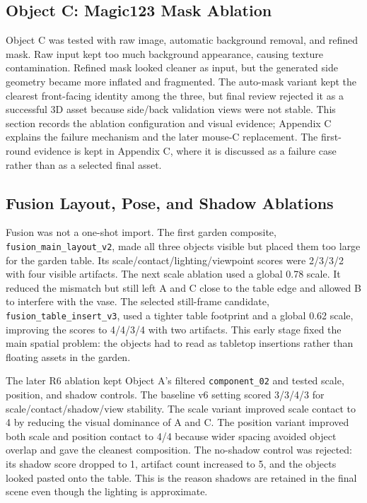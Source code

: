 \documentclass[10pt,twocolumn,letterpaper]{article}
\begin{document}
\subsection{Object C: Magic123 Mask Ablation}
Object C was tested with raw image, automatic background removal, and refined mask.
Raw input kept too much background appearance, causing texture contamination.
Refined mask looked cleaner as input, but the generated side geometry became more inflated and fragmented.
The auto-mask variant kept the clearest front-facing identity among the three, but final review rejected it as a successful 3D asset because side/back validation views were not stable.
This section records the ablation configuration and visual evidence; Appendix C explains the failure mechanism and the later mouse-C replacement.
The first-round evidence is kept in Appendix C, where it is discussed as a failure case rather than as a selected final asset.

\subsection{Fusion Layout, Pose, and Shadow Ablations}
Fusion was not a one-shot import.
The first garden composite, \texttt{fusion\_main\_layout\_v2}, made all three objects visible but placed them too large for the garden table.
Its scale/contact/lighting/viewpoint scores were 2/3/3/2 with four visible artifacts.
The next scale ablation used a global 0.78 scale.
It reduced the mismatch but still left A and C close to the table edge and allowed B to interfere with the vase.
The selected still-frame candidate, \texttt{fusion\_table\_insert\_v3}, used a tighter table footprint and a global 0.62 scale, improving the scores to 4/4/3/4 with two artifacts.
This early stage fixed the main spatial problem: the objects had to read as tabletop insertions rather than floating assets in the garden.

The later R6 ablation kept Object A's filtered \texttt{component\_02} and tested scale, position, and shadow controls.
The baseline v6 setting scored 3/3/4/3 for scale/contact/shadow/view stability.
The scale variant improved scale contact to 4 by reducing the visual dominance of A and C.
The position variant improved both scale and position contact to 4/4 because wider spacing avoided object overlap and gave the cleanest composition.
The no-shadow control was rejected: its shadow score dropped to 1, artifact count increased to 5, and the objects looked pasted onto the table.
This is the reason shadows are retained in the final scene even though the lighting is approximate.
\end{document}
